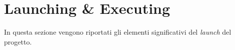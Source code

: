 \section{Launching \& Executing}
\label{sec:launching}

In questa sezione vengono riportati gli elementi significativi del \textit{launch} del progetto.